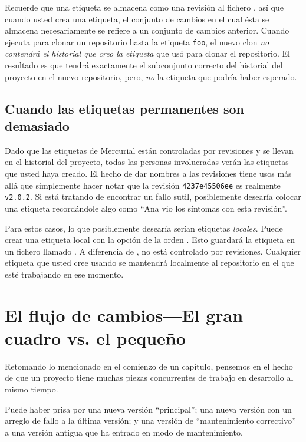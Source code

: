 Recuerde que una etiqueta se almacena como una revisión al fichero
, así que cuando usted crea una etiqueta, el
conjunto de cambios en el cual ésta se almacena necesariamente se
refiere a un conjunto de cambios anterior. Cuando ejecuta
 para clonar un repositorio hasta la etiqueta
\texttt{foo}, el nuevo clon \emph{no contendrá el historial que creo
la etiqueta} que usó para clonar el repositorio. El resultado es que tendrá
exactamente el subconjunto correcto del historial del proyecto en el
nuevo repositorio, pero, \emph{no} la etiqueta que podría haber esperado.

\subsection{Cuando las etiquetas permanentes son demasiado}

Dado que las etiquetas de Mercurial están controladas por revisiones y se
llevan en el historial del proyecto, todas las personas involucradas
verán las etiquetas que usted haya creado. El hecho de dar nombres a las
revisiones tiene usos más allá que simplemente hacer notar que la
revisión \texttt{4237e45506ee} es realmente \texttt{v2.0.2}.  Si está
tratando de encontrar un fallo sutil, posiblemente desearía colocar una 
etiqueta recordándole algo como ``Ana vio los síntomas con esta revisión''.

Para estos casos, lo que posiblemente desearía serían etiquetas
\emph{locales}. Puede crear una etiqueta local con la opción 
de la orden .  Esto guardará la etiqueta en un fichero llamado
.  A diferencia de ,
 no está controlado por revisiones.
Cualquier etiqueta que usted cree usando  se mantendrá
localmente al repositorio en el que esté trabajando en ese momento.

\section{El flujo de cambios---El gran cuadro vs. el pequeño}

Retomando lo mencionado en el comienzo de un capítulo, pensemos en el
hecho de que un proyecto tiene muchas piezas concurrentes de trabajo
en desarrollo al mismo tiempo.

Puede haber prisa por una nueva versión ``principal''; una nueva
versión con un arreglo de fallo a la última versión; y una versión de
``mantenimiento correctivo'' a una versión antigua que ha entrado en
modo de mantenimiento.

